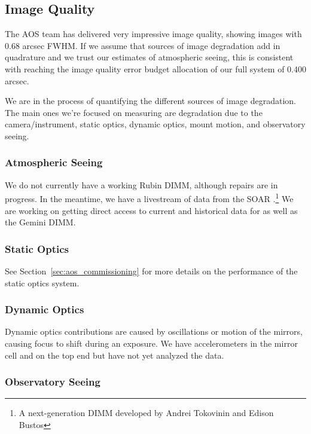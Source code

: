 \subsection{Image Quality}
\label{sec:image_quality}

The AOS team has delivered very impressive image quality, showing images with 0.68 arcsec FWHM. If we assume that sources of image degradation add in quadrature and we trust our estimates of atmospheric seeing, this is consistent with reaching the image quality error budget allocation of our full system of 0.400 arcsec.

We are in the process of quantifying the different sources of image degradation. The main ones we're focused on measuring are degradation due to the camera/instrument, static optics, dynamic optics, mount motion, and observatory seeing.

\subsubsection{Atmospheric Seeing}

We do not currently have a working Rubin DIMM, although repairs are in progress. In the meantime, we have a livestream of data from the SOAR \RINGSS.\footnote{A  next-generation DIMM developed by Andrei Tokovinin and Edison Bustos} We are working on getting direct access to current and historical data for \RINGSS as well as the Gemini DIMM.

\subsubsection{Static Optics}

See Section~\ref{sec:aos_commissioning} for more details on the performance of the static optics system.

\subsubsection{Dynamic Optics}

Dynamic optics contributions are caused by oscillations or motion of the mirrors, causing focus to shift during an exposure. We have accelerometers in the mirror cell and on the top end but have not yet analyzed the data.

\subsubsection{Observatory Seeing}

